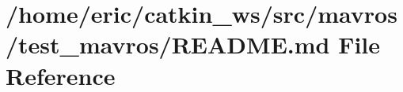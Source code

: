 \hypertarget{mavros_2test__mavros_2README_8md}{}\section{/home/eric/catkin\+\_\+ws/src/mavros/test\+\_\+mavros/\+R\+E\+A\+D\+ME.md File Reference}
\label{mavros_2test__mavros_2README_8md}
